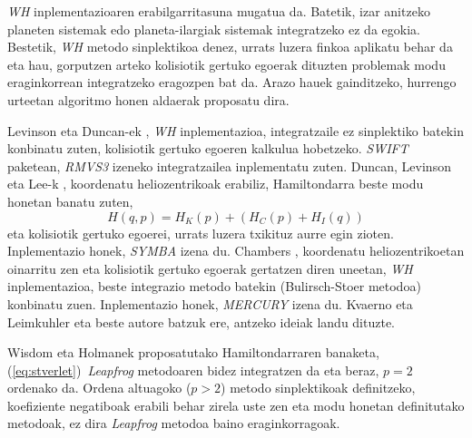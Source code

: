 \emph{WH} inplementazioaren erabilgarritasuna mugatua da. Batetik, izar anitzeko planeten sistemak edo planeta-ilargiak sistemak integratzeko ez da egokia. Bestetik, \emph{WH} metodo sinplektikoa denez, urrats luzera finkoa aplikatu behar da eta hau, gorputzen arteko kolisiotik gertuko egoerak dituzten problemak modu eraginkorrean integratzeko eragozpen bat da. Arazo hauek gainditzeko, hurrengo urteetan  algoritmo honen aldaerak proposatu dira. 

Levinson eta Duncan-ek \cite[1994]{Levison1994}, \emph{WH} inplementazioa, integratzaile ez sinplektiko batekin konbinatu zuten, kolisiotik gertuko egoeren kalkulua hobetzeko. \emph{SWIFT} paketean, \emph{RMVS3} izeneko integratzailea inplementatu zuten. Duncan, Levinson eta Lee-k \cite[1998]{Duncan1998}, koordenatu heliozentrikoak erabiliz, Hamiltondarra beste modu honetan banatu zuten,  
\begin{equation*}
H(q,p)=H_K(p)+(H_C(p)+H_I(q))
\end{equation*}
eta kolisiotik gertuko egoerei, urrats luzera txikituz aurre egin zioten. Inplementazio honek, \emph{SYMBA} izena du. Chambers \cite{Chambers1999}, koordenatu heliozentrikoetan oinarritu zen eta kolisiotik gertuko egoerak gertatzen diren uneetan, \emph{WH} inplementazioa, beste integrazio metodo batekin (Bulirsch-Stoer metodoa) konbinatu zuen. Inplementazio honek, \emph{MERCURY} izena du. %
Kvaerno eta Leimkuhler \cite{Kvaerno2000} eta beste autore batzuk ere, antzeko ideiak landu dituzte.


Wisdom eta Holmanek proposatutako Hamiltondarraren banaketa, (\ref{eq:stverlet})~\emph{Leapfrog} metodoaren bidez integratzen da eta beraz, $p=2$ ordenako da. Ordena altuagoko ($p>2$) metodo sinplektikoak definitzeko, koefiziente negatiboak erabili behar zirela uste zen \cite{Yoshida1993,Laskar2001} eta modu honetan definitutako metodoak, ez dira \emph{Leapfrog} metodoa baino eraginkorragoak.

